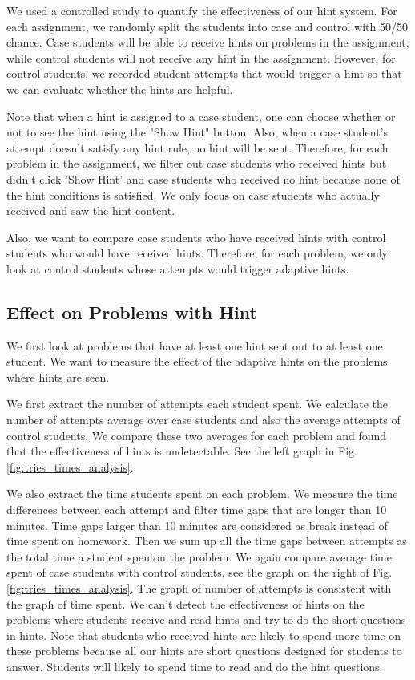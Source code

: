 \documentclass{llncs}
\begin{document}
We used a controlled study to quantify the effectiveness of our hint system. For each assignment, we randomly split the students into case and control with 50/50 chance. Case students will be able to receive hints on problems in the assignment, while control students will not receive any hint in the assignment. However, for control students, we recorded student attempts that would trigger a hint so that we can evaluate whether the hints are helpful.

Note that when a hint is assigned to a case student, one can choose whether or not to see the hint using the "Show Hint" button. Also, when a case student's attempt doesn't satisfy any hint rule, no hint will be sent. Therefore, for each problem in the assignment, we filter out case students who received hints but didn't click 'Show Hint' and case students who received no hint because none of the hint conditions is satisfied. We only focus on case students who actually received and saw the hint content.

Also, we want to compare case students who have received hints with control students who would have received hints. Therefore, for each problem, we only look at control students whose attempts would trigger adaptive hints.


\subsection{Effect on Problems with Hint}
We first look at problems that have at least one hint sent out to at least one student. We want to measure the effect of the adaptive hints on the problems where hints are seen.

We first extract the number of attempts each student spent. We calculate the number of attempts average over case students and also the average attempts of control students. We compare these two averages for each problem and found that the effectiveness of hints is undetectable. See the left graph in Fig. \ref{fig:tries_times_analysis}.

We also extract the time students spent on each problem. We measure the time differences between each attempt and filter time gaps that are longer than 10 minutes. Time gaps larger than 10 minutes are considered as break instead of time spent on homework. Then we sum up all the time gaps between attempts as the total time a student spenton the problem. We again compare average time spent of case students with control students, see the graph on the right of Fig. \ref{fig:tries_times_analysis}. The graph of number of attempts is consistent with the graph of time spent. We can't detect the effectiveness of hints on the problems where students receive and read hints and try to do the short questions in hints. Note that students who received hints are likely to spend more time on these problems because all our hints are short questions designed for students to answer. Students will likely to spend time to read and do the hint questions.
\end{document}
